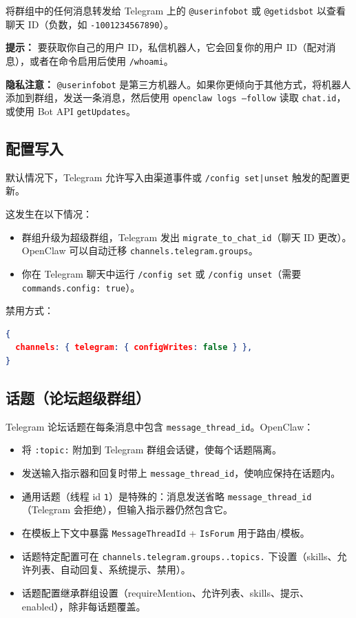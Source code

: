 将群组中的任何消息转发给 Telegram 上的 \texttt{@userinfobot} 或 \texttt{@getidsbot} 以查看聊天 ID（负数，如 \texttt{-1001234567890}）。

\textbf{提示：} 要获取你自己的用户 ID，私信机器人，它会回复你的用户 ID（配对消息），或者在命令启用后使用 \texttt{/whoami}。

\textbf{隐私注意：} \texttt{@userinfobot} 是第三方机器人。如果你更倾向于其他方式，将机器人添加到群组，发送一条消息，然后使用 \texttt{openclaw logs --follow} 读取 \texttt{chat.id}，或使用 Bot API \texttt{getUpdates}。

\subsection{配置写入}


默认情况下，Telegram 允许写入由渠道事件或 \texttt{/config set|unset} 触发的配置更新。

这发生在以下情况：

\begin{itemize}
  \item 群组升级为超级群组，Telegram 发出 \texttt{migrate\_to\_chat\_id}（聊天 ID 更改）。OpenClaw 可以自动迁移 \texttt{channels.telegram.groups}。
  \item 你在 Telegram 聊天中运行 \texttt{/config set} 或 \texttt{/config unset}（需要 \texttt{commands.config: true}）。
\end{itemize}


禁用方式：

\begin{lstlisting}[language=json]
{
  channels: { telegram: { configWrites: false } },
}
\end{lstlisting}


\subsection{话题（论坛超级群组）}


Telegram 论坛话题在每条消息中包含 \texttt{message\_thread\_id}。OpenClaw：

\begin{itemize}
  \item 将 \texttt{:topic:} 附加到 Telegram 群组会话键，使每个话题隔离。
  \item 发送输入指示器和回复时带上 \texttt{message\_thread\_id}，使响应保持在话题内。
  \item 通用话题（线程 id \texttt{1}）是特殊的：消息发送省略 \texttt{message\_thread\_id}（Telegram 会拒绝），但输入指示器仍然包含它。
  \item 在模板上下文中暴露 \texttt{MessageThreadId} + \texttt{IsForum} 用于路由/模板。
  \item 话题特定配置可在 \texttt{channels.telegram.groups..topics.} 下设置（skills、允许列表、自动回复、系统提示、禁用）。
  \item 话题配置继承群组设置（requireMention、允许列表、skills、提示、enabled），除非每话题覆盖。
\end{itemize}


